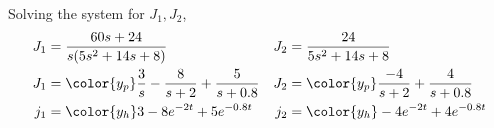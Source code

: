 \begin{enumerate}
\begin{enumerate}
                    Solving the system for $ J_1, J_2 $,
                    \begin{align}
                        J_1                 & = \frac{60s + 24}{s(5s^2 + 14s + 8)}    &
                        J_2                 & = \frac{24}{5s^2 + 14s + 8}               \\
                        J_1                 & = \color{y_p} \frac{3}{s}
                        - \frac{8}{s + 2}
                        + \frac{5}{s + 0.8} &
                        J_2                 & = \color{y_p}  \frac{-4}{s + 2}
                        + \frac{4}{s + 0.8}                                             \\
                        j_1                 & = \color{y_h} 3 - 8e^{-2t} + 5e^{-0.8t} &
                        j_2                 & = \color{y_h} -4e^{-2t} + 4e^{-0.8t}
                    \end{align}


\end{enumerate}
\end{enumerate}
